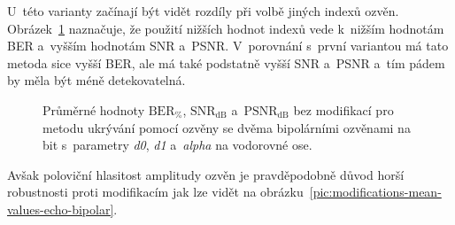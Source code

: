 U~této varianty začínají být vidět rozdíly při volbě jiných indexů ozvěn.
Obrázek~\ref{pic:no-mod-params-mean-values-echo-bipolar} naznačuje, že použití
nižších hodnot indexů vede k~nižším hodnotám BER a~vyšším hodnotám SNR a~PSNR.
V~porovnání s~první variantou má tato metoda sice vyšší BER, ale má také
podstatně vyšší SNR a~PSNR a~tím pádem by měla být méně detekovatelná.

\begin{figure}[H]
    \table
    \centering
    \caption{Průměrné hodnoty $\mathrm{BER}_{\%}$, $\mathrm{SNR}_\mathrm{dB}$
    a~$\mathrm{PSNR}_\mathrm{dB}$ bez modifikací pro metodu ukrývání pomocí
    ozvěny se dvěma bipolárními ozvěnami na bit s~parametry \textit{d0},
    \textit{d1} a~\textit{alpha} na vodorovné ose.}
    \label{pic:no-mod-params-mean-values-echo-bipolar}
\end{figure}

Avšak poloviční hlasitost amplitudy ozvěn je pravděpodobně důvod horší
robustnosti proti modifikacím jak lze vidět na
obrázku~\ref{pic:modifications-mean-values-echo-bipolar}.

